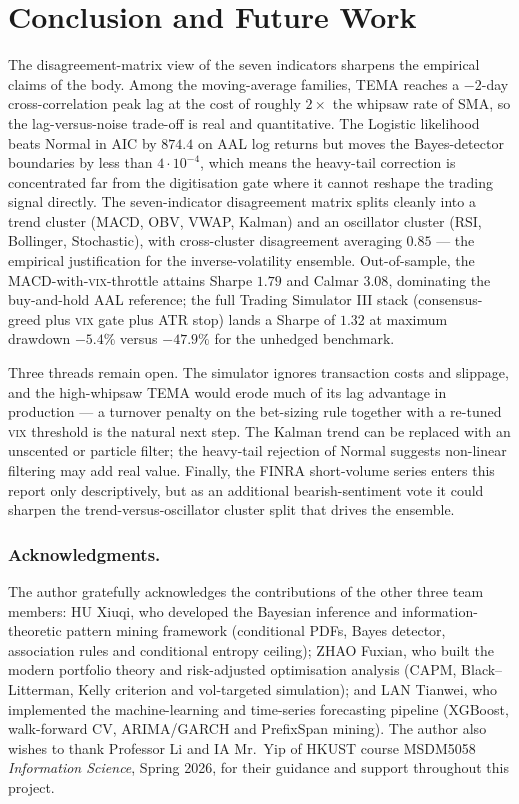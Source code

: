 \documentclass[runningheads]{llncs}
\begin{document}
\section{Conclusion and Future Work}\label{sec:conclusion}

The disagreement-matrix view of the seven indicators sharpens the
empirical claims of the body. Among the moving-average families, TEMA
reaches a $-2$-day cross-correlation peak lag at the cost of roughly
$2\!\times$ the whipsaw rate of SMA, so the lag-versus-noise trade-off
is real and quantitative. The Logistic likelihood beats Normal in AIC
by $\num{874.4}$ on AAL log returns but moves the Bayes-detector
boundaries by less than $4\!\cdot\!10^{-4}$, which means the
heavy-tail correction is concentrated far from the digitisation gate
where it cannot reshape the trading signal directly. The
seven-indicator disagreement matrix splits cleanly into a trend
cluster (MACD, OBV, VWAP, Kalman) and an oscillator cluster (RSI,
Bollinger, Stochastic), with cross-cluster disagreement averaging
$0.85$ --- the empirical justification for the inverse-volatility
ensemble. Out-of-sample, the MACD-with-\textsc{vix}-throttle attains
Sharpe $\num{1.79}$ and Calmar $\num{3.08}$, dominating the
buy-and-hold AAL reference; the full Trading Simulator III stack
(consensus-greed plus \textsc{vix} gate plus ATR stop) lands a
Sharpe of $\num{1.32}$ at maximum drawdown $-\num{5.4}\%$
versus $-\num{47.9}\%$ for the unhedged benchmark.

Three threads remain open. The simulator ignores transaction costs
and slippage, and the high-whipsaw TEMA would erode much of its lag
advantage in production --- a turnover penalty on the bet-sizing rule
together with a re-tuned \textsc{vix} threshold is the natural next
step. The Kalman trend can be replaced with an unscented or particle
filter; the heavy-tail rejection of Normal suggests non-linear
filtering may add real value. Finally, the FINRA short-volume series
enters this report only descriptively, but as an additional
bearish-sentiment vote it could sharpen the trend-versus-oscillator
cluster split that drives the ensemble.

\subsubsection*{Acknowledgments.}
The author gratefully acknowledges the contributions of the other three
team members:
HU Xiuqi, who developed the Bayesian inference and information-theoretic
pattern mining framework (conditional PDFs, Bayes detector, association
rules and conditional entropy ceiling);
ZHAO Fuxian, who built the modern portfolio theory and risk-adjusted
optimisation analysis (CAPM, Black--Litterman, Kelly criterion and
vol-targeted simulation);
and LAN Tianwei, who implemented the machine-learning and time-series
forecasting pipeline (XGBoost, walk-forward CV, ARIMA/GARCH and
PrefixSpan mining).
The author also wishes to thank Professor Li and IA Mr.\ Yip of HKUST
course MSDM5058 \emph{Information Science}, Spring 2026, for their
guidance and support throughout this project.



\end{document}
